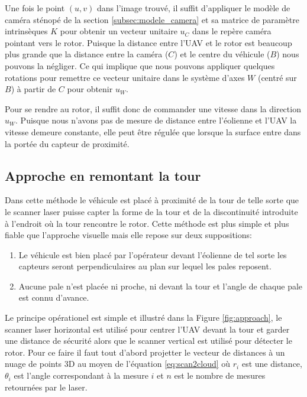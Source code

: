 Une fois le point $(u,v)$ dans l'image trouvé, il suffit d'appliquer le modèle de caméra sténopé de la section \ref{subsec:modele_camera} et sa matrice de paramètre intrinsèques $K$ pour obtenir un vecteur unitaire $u_C$ dans le repère caméra pointant vers le rotor. Puisque la distance entre l'UAV et le rotor est beaucoup plus grande que la distance entre la caméra ($C$) et le centre du véhicule ($B$) nous pouvons la négliger. Ce qui implique que nous pouvons appliquer quelques rotations pour remettre ce vecteur unitaire dans le système d'axes $W$ (centré sur $B$) à partir de $C$ pour obtenir $u_W$.

Pour se rendre au rotor, il suffit donc de commander une vitesse dans la direction $u_W$. Puisque nous n'avons pas de mesure de distance entre l'éolienne et l'UAV la vitesse demeure constante, elle peut être régulée que lorsque la surface entre dans la portée du capteur de proximité.

\subsection{Approche en remontant la tour}
\label{subsec:laser_tower}

Dans cette méthode le véhicule est placé à proximité de la tour de telle sorte que le scanner laser puisse capter la forme de la tour et de la discontinuité introduite à l'endroit où la tour rencontre le rotor. Cette méthode est plus simple et plus fiable que l'approche visuelle mais elle repose sur deux suppositions:
\begin{enumerate}
  \item Le véhicule est bien placé par l'opérateur devant l'éolienne de tel sorte les capteurs seront perpendiculaires au plan sur lequel les pales reposent.
  \item Aucune pale n'est placée ni proche, ni devant la tour et l'angle de chaque pale est connu d'avance.
\end{enumerate}

Le principe opérationel est simple et illustré dans la Figure \ref{fig:approach}, le scanner laser horizontal est utilisé pour centrer l'UAV devant la tour et garder une distance de sécurité alors que le scanner vertical est utilisé pour détecter le rotor. Pour ce faire il faut tout d'abord projetter le vecteur de distances à un nuage de points 3D au moyen de l'équation \ref{eq:scan2cloud} où $r_i$ est une distance, $\theta_i$ est l'angle correspondant à la mesure $i$ et $n$ est le nombre de mesures retournées par le laser.

